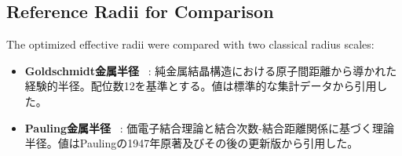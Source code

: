 \documentclass[a4paper,10pt,5p]{elsarticle}
\begin{document}



\subsection{Reference Radii for Comparison}

The optimized effective radii were compared with two classical radius scales:
\begin{itemize}
\setlength{\parskip}{0cm} %
\setlength{\itemsep}{0cm} %
    \item \textbf{Goldschmidt金属半径} ~\citep{goldschmidt1927}: 純金属結晶構造における原子間距離から導かれた経験的半径。配位数12を基準とする。値は標準的な集計データから引用した。
   \item \textbf{Pauling金属半径} ~\citep{pauling1947}: 価電子結合理論と結合次数-結合距離関係に基づく理論半径。値はPaulingの1947年原著及びその後の更新版から引用した。
\end{itemize}


\end{document}
